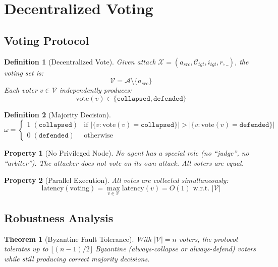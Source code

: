 \documentclass[11pt,a4paper]{article}
\newtheorem{definition}{Definition}
\newtheorem{theorem}{Theorem}
\newtheorem{property}{Property}
\begin{document}
\section{Decentralized Voting}

\subsection{Voting Protocol}

\begin{definition}[Decentralized Vote]
Given attack $\mathcal{X} = (a_{src}, \mathcal{C}_{tgt}, i_{tgt}, r, \_)$, the voting set is:
$$\mathcal{V} = \mathcal{A} \setminus \{a_{src}\}$$
Each voter $v \in \mathcal{V}$ independently produces:
$$\text{vote}(v) \in \{\texttt{collapsed}, \texttt{defended}\}$$
\end{definition}

\begin{definition}[Majority Decision]
$$\omega = \begin{cases}
1 \; (\texttt{collapsed}) & \text{if } |\{v : \text{vote}(v) = \texttt{collapsed}\}| > |\{v : \text{vote}(v) = \texttt{defended}\}| \\
0 \; (\texttt{defended}) & \text{otherwise}
\end{cases}$$
\end{definition}

\begin{property}[No Privileged Node]
No agent has a special role (no ``judge'', no ``arbiter''). The attacker does not vote on its own attack. All voters are equal.
\end{property}

\begin{property}[Parallel Execution]
All votes are collected simultaneously:
$$\text{latency}(\text{voting}) = \max_{v \in \mathcal{V}} \text{latency}(v) = O(1) \text{ w.r.t. } |\mathcal{V}|$$
\end{property}

\subsection{Robustness Analysis}

\begin{theorem}[Byzantine Fault Tolerance]
With $|\mathcal{V}| = n$ voters, the protocol tolerates up to $\lfloor (n-1)/2 \rfloor$ Byzantine (always-collapse or always-defend) voters while still producing correct majority decisions.
\end{theorem}
\end{document}
